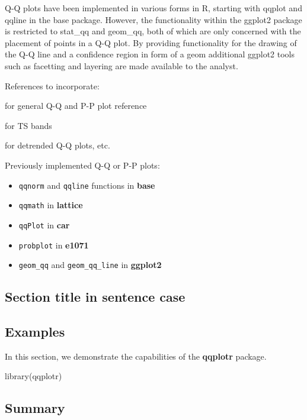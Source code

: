 Q-Q plots have been implemented in various forms in R, starting with
qqplot and qqline in the base package. However, the functionality within
the ggplot2 package is restricted to stat\_qq and geom\_qq, both of
which are only concerned with the placement of points in a Q-Q plot. By
providing functionality for the drawing of the Q-Q line and a confidence
region in form of a geom additional ggplot2 tools such as facetting and
layering are made available to the analyst.

References to incorporate:

\citet{Wilk1968-ii} for general Q-Q and P-P plot reference

\citet{Aldor-Noiman2013-xw} for TS bands

\citet{Loy2016-fg} for detrended Q-Q plots, etc.

Previously implemented Q-Q or P-P plots:

\begin{itemize}
\tightlist
\item
  \texttt{qqnorm} and \texttt{qqline} functions in \textbf{base}
  \citep{R}
\item
  \texttt{qqmath} in \textbf{lattice} \citep{lattice}
\item
  \texttt{qqPlot} in \textbf{car} \citep{car}
\item
  \texttt{probplot} in \textbf{e1071} \citep{e1071}
\item
  \texttt{geom\_qq} and \texttt{geom\_qq\_line} in \textbf{ggplot2}
  \citep{ggplot2}
\end{itemize}

\subsection{Section title in sentence
case}\label{section-title-in-sentence-case}

\subsection{Examples}\label{examples}

In this section, we demonstrate the capabilities of the \textbf{qqplotr}
package.

\begin{Schunk}
\begin{Sinput}
library(qqplotr)
\end{Sinput}
\end{Schunk}

\subsection{Summary}\label{summary}

